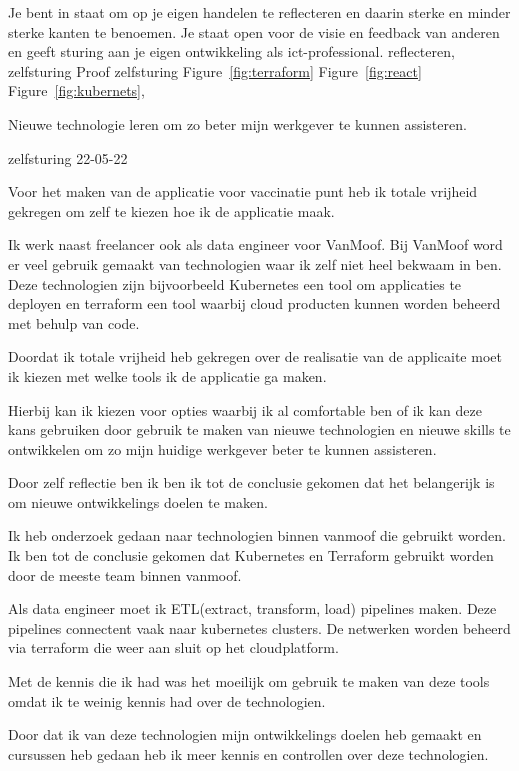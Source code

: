 \competentie
{%
	\competentieformulier
	{%
		Je bent in staat om op je eigen handelen te reflecteren
		en daarin sterke en minder sterke kanten te
		benoemen. Je staat open voor de visie en feedback
		van anderen en geeft sturing aan je eigen ontwikkeling
		als ict-professional.
	}
	{%
		reflecteren,
		zelfsturing
	}
	{%
		Proof
	}
	{%
		zelfsturing
	}
	{%
		Figure~\ref{fig:terraform}
		Figure~\ref{fig:react}
		Figure~\ref{fig:kubernets},
	}
}
{%
	\bewijs
	{
		Nieuwe technologie leren om zo beter mijn werkgever te kunnen assisteren.
	}
	{%
		\starr
		{%
			zelfsturing
		}
		{%
			22-05-22
		}
		{%
			Voor het maken van de applicatie voor vaccinatie punt heb ik totale vrijheid gekregen om zelf te kiezen hoe ik de applicatie maak.

			Ik werk naast freelancer ook als data engineer voor VanMoof.
			Bij VanMoof word er veel gebruik gemaakt van technologien waar ik zelf niet heel bekwaam in ben.
			Deze technologien zijn bijvoorbeeld Kubernetes een tool om applicaties te deployen en terraform een tool waarbij cloud producten kunnen worden beheerd met behulp van code.
		}
		{%
			Doordat ik totale vrijheid heb gekregen over de realisatie van de applicaite moet ik kiezen met welke tools ik de applicatie ga maken.


			Hierbij kan ik kiezen voor opties waarbij ik al comfortable ben of ik kan deze kans gebruiken door gebruik te maken van nieuwe technologien en nieuwe skills te ontwikkelen om zo mijn huidige werkgever beter te kunnen assisteren.

			Door zelf reflectie ben ik ben ik tot de conclusie gekomen dat het belangerijk is om nieuwe ontwikkelings doelen te maken.

		}
		{%
			Ik heb onderzoek gedaan naar technologien binnen vanmoof die gebruikt worden.
			Ik ben tot de conclusie gekomen dat Kubernetes en Terraform gebruikt worden door de meeste team binnen vanmoof.

			Als data engineer moet ik ETL(extract, transform, load) pipelines maken. Deze pipelines connectent vaak naar kubernetes clusters.
			De netwerken worden beheerd via terraform die weer aan sluit op het cloudplatform.

			Met de kennis die ik had was het moeilijk om gebruik te maken van deze tools omdat ik te weinig kennis had over de technologien.

			Door dat ik van deze technologien mijn ontwikkelings doelen heb gemaakt en cursussen heb gedaan heb ik meer kennis en controllen over deze technologien.

}}}
